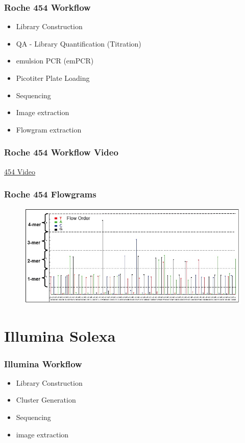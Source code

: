 \documentclass[pdf]{beamer}
\begin{document}
\begin{frame}
  \frametitle{Roche 454 Workflow}
  \begin{itemize}
  \item Library Construction
  \item QA - Library Quantification (Titration)
  \item emulsion PCR (emPCR)
  \item Picotiter Plate Loading
  \item Sequencing
  \item Image extraction
  \item Flowgram extraction
  \end{itemize}
\end{frame}

\begin{frame}
  \frametitle{Roche 454 Workflow Video}
  \begin{center}
  \href{http://www.youtube.com/watch?feature=player_detailpage&v=bFNjxKHP8Jc}{454 Video}
  \end{center}  
\end{frame}

\begin{frame}
  \frametitle{Roche 454 Flowgrams}
  \begin{center}
    \begin{figure}
    \includegraphics[scale=0.35]{Flowgram.jpg}
  \end{figure}
  \end{center}
\end{frame}

\section{Illumina Solexa}

\begin{frame}
  \frametitle{Illumina Workflow}
  \begin{itemize}
  \item Library Construction
  \item Cluster Generation
  \item Sequencing
  \item image extraction
  \end{itemize}
\end{frame}
  
\end{document}

